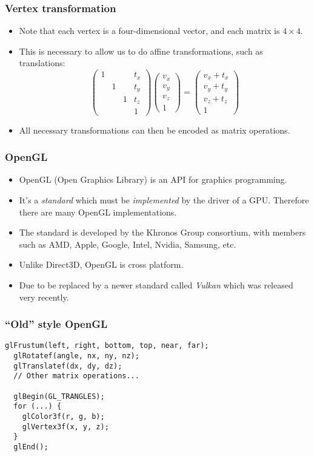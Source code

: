 \begin{frame}
  \frametitle{Vertex transformation}
  \begin{itemize}
  \item Note that each vertex is a four-dimensional vector, and each matrix is
    $4 \times 4$.
  \item This is necessary to allow us to do affine transformations, such as
    translations:
    \[
      \begin{pmatrix}
        1 &   &   & t_x \\
        & 1 &   & t_y \\
        &   & 1 & t_z \\
        &   &   & 1
      \end{pmatrix}
      \begin{pmatrix} v_x \\ v_y \\ v_z \\ 1 \end{pmatrix}
      =
      \begin{pmatrix} v_x + t_x \\ v_y + t_y \\ v_z + t_z \\ 1 \end{pmatrix}
    \]
  \item All necessary transformations can then be encoded as matrix operations.
  \end{itemize}
\end{frame}

\begin{frame}
  \frametitle{OpenGL}
  \begin{itemize}
  \item OpenGL (Open Graphics Library) is an API for graphics programming.
  \item It's a \emph{standard} which must be \emph{implemented} by the driver of
    a GPU. Therefore there are many OpenGL implementations.
  \item The standard is developed by the Khronos Group consortium, with members
    such as AMD, Apple, Google, Intel, Nvidia, Samsung, etc.
  \item Unlike Direct3D, OpenGL is cross platform.
  \item Due to be replaced by a newer standard called \emph{Vulkan} which was
    released very recently.
  \end{itemize}
\end{frame}

\begin{frame}[fragile]
  \frametitle{``Old'' style OpenGL}
  \begin{lstlisting}[style=c]
  glFrustum(left, right, bottom, top, near, far);
  glRotatef(angle, nx, ny, nz);
  glTranslatef(dx, dy, dz);
  // Other matrix operations...

  glBegin(GL_TRANGLES);
  for (...) {
    glColor3f(r, g, b);
    glVertex3f(x, y, z);
  }
  glEnd();
  \end{lstlisting}
\end{frame}

